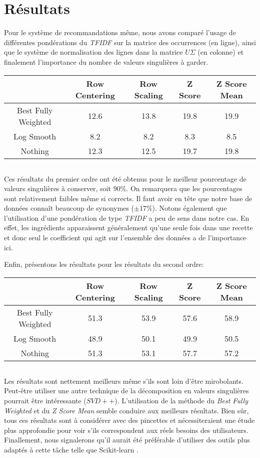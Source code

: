 \section{Résultats}

Pour le système de recommandations même, nous avons comparé l'usage de différentes pondérations du \textit{TFIDF} sur la matrice des occurrences (en ligne), ainsi que le système de normalisation des lignes dans la matrice $U\Sigma$ (en colonne) et finalement l'importance du nombre de valeurs singulières à garder. \\

\begin{tabular}{|c|c|c|c|c|}
  \hline
  & Row Centering & Row Scaling & Z Score & Z Score Mean \\
  \hline
  Best Fully Weighted & 12.6 & 13.8 & 19.8 & 19.9 \\
  Log Smooth & 8.2 & 8.2 & 8.3 & 8.5 \\
  Nothing & 12.3 & 12.5 & 19.7 & 19.8 \\
  \hline
\end{tabular}

$$ $$

Ces résultats du premier ordre ont été obtenus pour le meilleur pourcentage de valeurs singulières à conserver, soit 90\%. On remarquera que les pourcentages sont relativement faibles même si corrects. Il faut avoir en tête que notre base de données connaît beaucoup de synonymes ($\pm 17\%$). Notons également que l'utilisation d'une pondération de type \textit{TFIDF} a peu de sens dans notre cas. En effet, les ingrédients apparaissent généralement qu'une seule fois dans une recette et donc seul le coefficient qui agit sur l'ensemble des données a de l'importance ici.

Enfin, présentons les résultats pour les résultats du second ordre: \\

\begin{tabular}{|c|c|c|c|c|}
  \hline
  & Row Centering & Row Scaling & Z Score & Z Score Mean \\
  \hline
  Best Fully Weighted & 51.3 & 53.9 & 57.6 & 58.9 \\
  Log Smooth & 48.9 & 50.1 & 49.9 & 50.5 \\
  Nothing & 51.3 & 53.1 & 57.7 & 57.2 \\
  \hline
\end{tabular}

$$ $$

Les résultats sont nettement meilleurs même s'ils sont loin d'être mirobolants. Peut-être utiliser une autre technique de la décomposition en valeurs singulières pourrait être intéressante (${S}{V}{D}{+}{+}$). L'utilisation de la méthode du \textit{Best Fully Weighted} et du \textit{Z Score Mean} semble conduire aux meilleurs résultats. Bien sûr, tous ces résultats sont à considérer avec des pincettes et nécessiteraient une étude plus approfondie pour voir s'ils correspondent aux réels besoins des utilisateurs.
Finallement, nous signalerons qu'il aurait été préférable d'utiliser des outils plus adaptés à cette tâche telle que Scikit-learn \cite{SCIKIT}.

\begin{footnotesize}


\end{footnotesize}